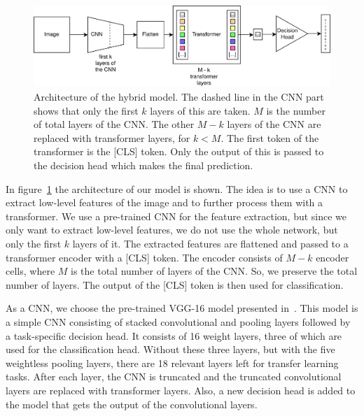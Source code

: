 \documentclass[a4paper]{scrartcl}
\begin{document}
    \begin{figure}[btp]
        \centering
        \includegraphics[width=1.0\linewidth]{img/HybridModelArchitecture}
        \caption[Architecture of the hybrid model]{Architecture of the hybrid model.
        The dashed line in the CNN part shows that only the first $k$ layers of this are taken.
            $M$ is the number of total layers of the CNN.
            The other $M - k$ layers of the CNN are replaced with transformer layers, for $k < M$.
            The first token of the transformer is the [CLS] token.
            Only the output of this is passed to the decision head which makes the final prediction.
        }
        \label{fig:architecture-hybrid-model}
    \end{figure}

    In figure~\ref{fig:architecture-hybrid-model} the architecture of our model is shown.
    The idea is to use a CNN to extract low-level features of the image and to further process them with a transformer.
    We use a pre-trained CNN for the feature extraction, but since we only want to extract low-level features, we do not use the whole network, but only the first $k$ layers of it.
    The extracted features are flattened and passed to a transformer encoder with a [CLS] token.
    The encoder consists of $M - k$ encoder cells, where $M$ is the total number of layers of the CNN\@.
    So, we preserve the total number of layers.
    The output of the [CLS] token is then used for classification.

    As a CNN, we choose the pre-trained VGG-16 model presented in~\cite{simonyan2015deep}.
    This model is a simple CNN consisting of stacked convolutional and pooling layers followed by a task-specific decision head.
    It consists of 16 weight layers, three of which are used for the classification head.
    Without these three layers, but with the five weightless pooling layers, there are 18 relevant layers left for transfer learning tasks.
    After each layer, the CNN is truncated and the truncated convolutional layers are replaced with transformer layers.
    Also, a new decision head is added to the model that gets the output of the convolutional layers.
\end{document}
